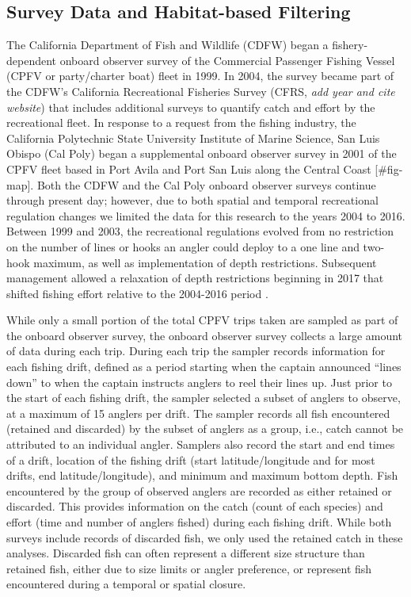 \documentclass[
  12pt,
  authoryear,
  preprint,
  3p]{elsarticle}
\begin{document}
\hypertarget{survey-data-and-habitat-based-filtering}{%
\subsection{Survey Data and Habitat-based
Filtering}\label{survey-data-and-habitat-based-filtering}}

The California Department of Fish and Wildlife (CDFW) began a
fishery-dependent onboard observer survey of the Commercial Passenger
Fishing Vessel (CPFV or party/charter boat) fleet in 1999. In 2004, the
survey became part of the CDFW's California Recreational Fisheries
Survey (CFRS, \emph{add year and cite website}) that includes additional
surveys to quantify catch and effort by the recreational fleet. In
response to a request from the fishing industry, the California
Polytechnic State University Institute of Marine Science, San Luis
Obispo (Cal Poly) began a supplemental onboard observer survey in 2001
of the CPFV fleet based in Port Avila and Port San Luis along the
Central Coast {[}\#fig-map{]}. Both the CDFW and the Cal Poly onboard
observer surveys continue through present day; however, due to both
spatial and temporal recreational regulation changes we limited the data
for this research to the years 2004 to 2016. Between 1999 and 2003, the
recreational regulations evolved from no restriction on the number of
lines or hooks an angler could deploy to a one line and two-hook
maximum, as well as implementation of depth restrictions. Subsequent
management allowed a relaxation of depth restrictions beginning in 2017
that shifted fishing effort relative to the 2004-2016 period
\citep{Monk:2021:SVR}.

While only a small portion of the total CPFV trips taken are sampled as
part of the onboard observer survey, the onboard observer survey
collects a large amount of data during each trip. During each trip the
sampler records information for each fishing drift, defined as a period
starting when the captain announced ``lines down'' to when the captain
instructs anglers to reel their lines up. Just prior to the start of
each fishing drift, the sampler selected a subset of anglers to observe,
at a maximum of 15 anglers per drift. The sampler records all fish
encountered (retained and discarded) by the subset of anglers as a
group, i.e., catch cannot be attributed to an individual angler.
Samplers also record the start and end times of a drift, location of the
fishing drift (start latitude/longitude and for most drifts, end
latitude/longitude), and minimum and maximum bottom depth. Fish
encountered by the group of observed anglers are recorded as either
retained or discarded. This provides information on the catch (count of
each species) and effort (time and number of anglers fished) during each
fishing drift. While both surveys include records of discarded fish, we
only used the retained catch in these analyses. Discarded fish can often
represent a different size structure than retained fish, either due to
size limits or angler preference, or represent fish encountered during a
temporal or spatial closure.
\end{document}
